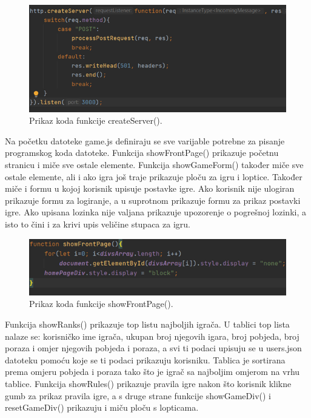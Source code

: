 \begin{figure}[H]
\centering
\includegraphics[width=14cm]{slike-kod/Slika2.png}
\caption{Prikaz koda funkcije createServer().}
\label{}
\end{figure}






Na početku datoteke game.js definiraju se sve varijable potrebne za pisanje programskog koda datoteke. Funkcija showFrontPage() prikazuje početnu stranicu i miče sve ostale elemente. Funkcija showGameForm() također miče sve ostale elemente, ali i ako igra još traje prikazuje ploču za igru i loptice. Također miče i formu u kojoj korisnik upisuje postavke igre. Ako korisnik nije ulogiran prikazuje formu za logiranje, a u suprotnom prikazuje formu za prikaz postavki igre. Ako upisana lozinka nije valjana prikazuje upozorenje o pogrešnoj lozinki, a isto to čini i za krivi upis veličine stupaca za igru.


\begin{figure}[H]
\centering
\includegraphics[width=14cm]{slike-kod/Slika3.png}
\caption{Prikaz koda funkcije showFrontPage().}
\label{}
\end{figure}

Funkcija showRanks() prikazuje top listu najboljih igrača. U tablici top lista nalaze se: korisničko ime igrača, ukupan broj njegovih igara, broj pobjeda, broj poraza i omjer njegovih pobjeda i poraza, a svi ti podaci upisuju se u users.json datoteku pomoću koje se ti podaci prikazuju korisniku. Tablica je sortirana prema omjeru pobjeda i poraza tako što je igrač sa najboljim omjerom na vrhu tablice. Funkcija showRules() prikazuje pravila igre nakon što korisnik klikne gumb za prikaz pravila igre, a s druge strane funkcije showGameDiv() i resetGameDiv() prikazuju i miču ploču s lopticama. 


